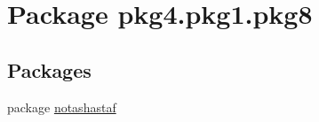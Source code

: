 \hypertarget{namespacepkg4_1_1pkg1_1_1pkg8}{}\section{Package pkg4.\+pkg1.\+pkg8}
\label{namespacepkg4_1_1pkg1_1_1pkg8}
\subsection*{Packages}
\begin{DoxyCompactItemize}
\item 
package \mbox{\hyperlink{namespacepkg4_1_1pkg1_1_1pkg8_1_1notashastaf}{notashastaf}}
\end{DoxyCompactItemize}

